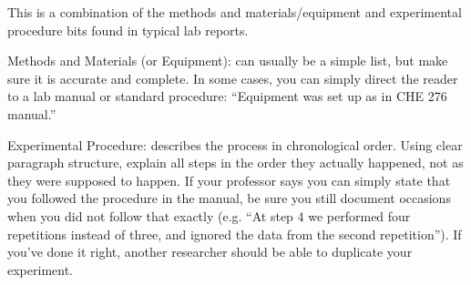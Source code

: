 This is a combination of the methods and materials/equipment and experimental procedure bits found in typical lab reports.

Methods and Materials (or Equipment):
 can usually be a simple list, but make sure it is 
accurate and complete.
In some cases, you can simply direct the reader to a lab manual or standard procedure: 
“Equipment was set up as in CHE 276 manual.”

Experimental Procedure: 
describes the process in chronological order.
Using clear paragraph structure, explain all steps in the order 
they actually happened, not as they were supposed 
to happen.
If your professor says you can simply 
state that you followed the procedure in the 
manual, be sure you still document occasions 
when you did not follow that exactly (e.g. “At step 
4 we performed four repetitions instead of three, 
and ignored the data from the second repetition”). 
If you've done it right, another researcher should 
be able to duplicate your experiment.
